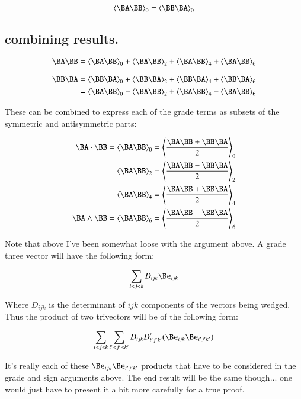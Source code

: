 \documentclass{article}      %
\newcommand{\gpgrade}[2] {{\left\langle{{#1}}\right\rangle}_{#2}}
\begin{document}
\begin{equation}\label{eqn:trivecgpgrade0}
\gpgrade{\BA\BB}{0} = \gpgrade{\BB\BA}{0}
\end{equation}

\subsection{ combining results. }

\begin{equation*}
\BA \BB
=\gpgrade{\BA\BB}{0}
+\gpgrade{\BA\BB}{2}
+\gpgrade{\BA\BB}{4}
+\gpgrade{\BA\BB}{6}
\end{equation*}

\begin{align*}
\BB\BA
&=\gpgrade{\BB\BA}{0}
+\gpgrade{\BB\BA}{2}
+\gpgrade{\BB\BA}{4}
+\gpgrade{\BB\BA}{6} \\
&=\gpgrade{\BA\BB}{0}
-\gpgrade{\BA\BB}{2}
+\gpgrade{\BA\BB}{4}
-\gpgrade{\BA\BB}{6} \\
\end{align*}

These can be combined to express each of the grade terms as subsets
of the symmetric and antisymmetric parts:

\begin{align*}
\BA \cdot \BB = \gpgrade{\BA\BB}{0} &= \gpgrade{\frac{\BA\BB + \BB\BA}{2}}{0} \\
\gpgrade{\BA\BB}{2} &= \gpgrade{\frac{\BA\BB - \BB\BA}{2}}{2} \\
\gpgrade{\BA\BB}{4} &= \gpgrade{\frac{\BA\BB + \BB\BA}{2}}{4} \\
\BA \wedge \BB = \gpgrade{\BA\BB}{6} &= \gpgrade{\frac{\BA\BB - \BB\BA}{2}}{6} \\
\end{align*}

Note that above I've been somewhat loose with the argument above.  A grade three vector
will have the following form:

\[
\sum_{i<j<k} D_{ijk} \Be_{ijk}
\]

Where $D_{ijk}$ is the determinant of $ijk$ components of the vectors being wedged.  Thus the product
of two trivectors will be of the following form:

\[
\sum_{i<j<k} \sum_{i'<j'<k'} D_{ijk} D'_{i'j'k'} (\Be_{ijk} \Be_{i'j'k'})
\]

It's really each of these $\Be_{ijk} \Be_{i'j'k'}$ products that have to be considered in the grade 
and sign arguments above.  The end result will be the same though... one would just have to present
it a bit more carefully for a true proof.
\end{document}
